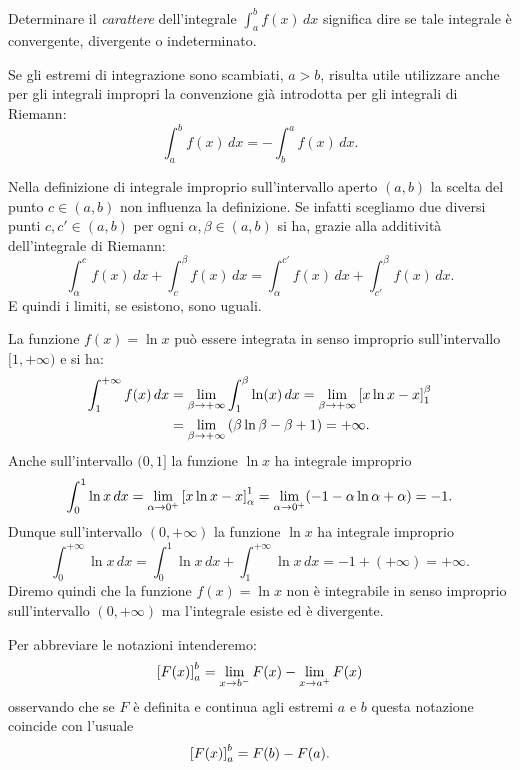 \begin{definition}
Determinare il \emph{carattere}
%
%
%
%
dell'integrale $\int_a^b f(x)\, dx$
significa dire se tale integrale è convergente, divergente o indeterminato.

Se gli estremi di integrazione sono scambiati, $a>b$,
risulta utile utilizzare anche per gli integrali impropri
la convenzione
già introdotta per gli integrali di Riemann:
\[
  \int_a^b f(x) \, dx = - \int_b^a f(x)\, dx.
\]
\end{definition}

\begin{remark}\label{rem:4821341}
Nella definizione di integrale improprio sull'intervallo
aperto $(a,b)$ la scelta del punto $c\in(a,b)$ non influenza la definizione.
Se infatti scegliamo due diversi punti $c,c'\in(a,b)$ per ogni $\alpha,\beta \in (a,b)$
si ha, grazie alla additività dell'integrale di Riemann:
\[
  \int_\alpha^c f(x)\,dx + \int_c^\beta f(x)\,dx =
  \int_\alpha^{c'} f(x)\, dx + \int_{c'}^\beta f(x)\, dx.
\]
E quindi i limiti, se esistono, sono uguali.
\end{remark}

\begin{example}
La funzione $f(x)= \ln x$ può essere integrata in senso improprio sull'intervallo
$[1,+\infty)$ e si ha:
\begin{align*}
 \int_1^{+\infty} f(x)\,dx
 &= \lim_{\beta\to +\infty} \int_1^\beta \ln(x)\, dx
 = \lim_{\beta\to +\infty}{\left[ x\ln x - x \right]}_1^\beta \\
 &= \lim_{\beta\to +\infty} {\left( \beta \ln \beta - \beta + 1 \right)}
 = +\infty.
\end{align*}
Anche sull'intervallo $(0,1]$ la funzione $\ln x$ ha integrale improprio
\[
  \int_0^1 \ln x\, dx = \lim_{\alpha \to 0^+}{\left[ x \ln x -x \right]}_\alpha^1
  = \lim_{\alpha\to 0^+} (-1-\alpha \ln \alpha + \alpha)  = -1.
\]
Dunque sull'intervallo $(0,+\infty)$ la funzione $\ln x$ ha integrale improprio
\[
  \int_0^{+\infty}\ln x\, dx = \int_0^1 \ln x\, dx + \int_1^{+\infty}\ln x\, dx
   = -1 + (+\infty) = +\infty.
\]
Diremo quindi che la funzione $f(x)=\ln x$ non è integrabile in senso improprio
sull'intervallo $(0,+\infty)$ ma l'integrale esiste ed è divergente.
\end{example}

Per abbreviare le notazioni intenderemo:
\[
  {\left[ F(x) \right]}_a^b
  = \lim_{x\to b^-}F(x) - \lim_{x\to a^+}F(x)
\]
osservando che se $F$ è definita e continua agli estremi $a$ e $b$ questa notazione coincide con l'usuale
\[
{\left[ F(x) \right]}_a^b = F(b) - F(a).
\]

